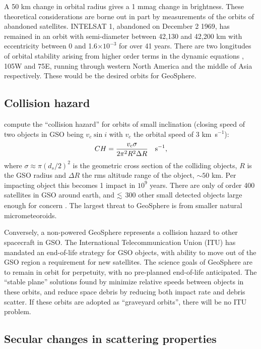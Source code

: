\documentclass[useAMS,usenatbib]{mn2e}
\newcommand{\be}[1]{\begin{equation} \label{eq:#1}}
\newcommand{\ee}{\end{equation}}
\newcommand\lta { \mathrel {\hbox to 0pt {\lower 3.7pt \hbox{$\sim$}
      \hss} \raise 1.7pt \hbox{$<$}}}
\newcommand\name{LAMBERT}
\renewcommand\name{GeoSphere}
\begin{document}
A 50 km change in orbital radius gives a 1 mmag change in brightness. 
These theoretical considerations are borne out in part by measurements
of the orbits of abandoned satellites.  
INTELSAT 1, abandoned on December 2
1969, has remained in an orbit with
semi-diameter between 42,130 and 42,200 km with eccentricity between 0
and 1.6$\times10^{-3}$ \citep[e.g.][]{Ulivieri+others2013}
for over 41 years. 
There are two longitudes of orbital stability arising from
higher order terms in the dynamic equations \citep{Friesen+others1992},
105W and 75E, running through western North America and the middle
of Asia respectively.   These would be the desired orbits for \name.

\subsection{Collision hazard}

\cite{Friesen+others1992}  compute the ``collision hazard'' for orbits of
small inclination (closing speed of two objects in GSO being
$v_c \sin i$ with $v_c$ the orbital speed of 3 km~s$^{-1}$):
%
\be{cr}
CH = \frac{v_c\sigma}{2\pi^2R^2\Delta R}  \ \ \ {\rm s^{-1}}, 
\ee
%
where $\sigma \approx \pi (d_s/2)^2$ is the geometric cross section of
the colliding objects, $R$ is the GSO radius and
$\Delta R$ the rms altitude range of the object, $\sim 50$ km.  Per
impacting object this becomes 1 impact in $10^9$ years.  There are only of
order 400 satellites in GSO  around earth, and $\lta$ 300 
other small detected objects large enough for concern
\citep[][Figure 2.2]{nsa_damage}. 
The largest
threat to \name{} is from smaller natural micrometeoroids.

Conversely, a non-powered \name{} represents a collision hazard to
other spacecraft in GSO.  The International Telecommunication Union 
(ITU) has mandated an
end-of-life strategy for GSO objects, with ability to move
out of the GSO region a requirement for new satellites. The
science goals of \name{} are to remain in orbit for perpetuity,
with no pre-planned end-of-life anticipated.   
The ``stable plane'' solutions found by
\citet{Friesen+others1992} minimize relative speeds between objects in
these orbits, and reduce space debris by reducing both impact rate and
debris scatter. If these orbits are adopted as ``graveyard orbits'',
there will be no ITU problem.


\subsection{Secular changes in scattering properties}
\end{document}
